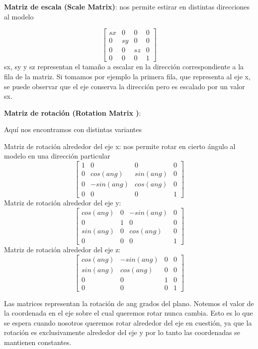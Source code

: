 \documentclass[a4paper]{article}
\begin{document}
\textbf{Matriz de escala (Scale Matrix)}: nos permite estirar en distintas direcciones al modelo
 
\[
\begin{bmatrix}
sx & 0 & 0 & 0 \\
0 & sy & 0 & 0 \\
0 & 0 & sz & 0 \\
0 & 0 & 0 & 1  
\end{bmatrix}
\]
sx, sy y sz representan el tamaño a escalar en la dirección correspondiente a la fila de la matriz. Si tomamos por ejemplo la primera fila, que representa al eje x, se puede observar que el eje conserva la dirección pero es escalado por un valor sx. 



\textbf{Matriz de rotación (Rotation Matrix )}:


 Aquí nos encontramos con distintas variantes 
 
 
 
Matriz de rotación alrededor del eje x: nos permite rotar en cierto ángulo al modelo en una dirección particular
\[
\begin{bmatrix}
1 & 0 & 0 & 0 \\
0 & cos(ang) & sin(ang) & 0 \\
0 & -sin(ang) & cos(ang) & 0 \\
0 & 0 & 0 & 1  
\end{bmatrix}
\]
Matriz de rotación alrededor del eje y:
\[
\begin{bmatrix}
cos(ang) & 0 & -sin(ang) & 0 \\
0 & 1 & 0 & 0 \\
sin(ang) & 0 & cos(ang) & 0 \\
0 & 0 & 0 & 1  
\end{bmatrix}
\]
Matriz de rotación alrededor del eje z:
\[
\begin{bmatrix}
cos(ang) & -sin(ang) & 0 & 0 \\
sin(ang) & cos(ang) & 0 & 0 \\
0 & 0 & 1 & 0 \\
0 & 0 & 0 & 1  
\end{bmatrix}
\]


Las  matrices representan  la rotación de ang grados del plano. Notemos el valor de la coordenada en el eje sobre el cual queremos rotar nunca cambia. Esto es lo que se espera cuando nosotros queremos rotar alrededor del eje en cuestión, ya que  la rotación es exclusivamente alrededor del eje y por lo tanto las coordenadas se mantienen constantes.
\end{document}
